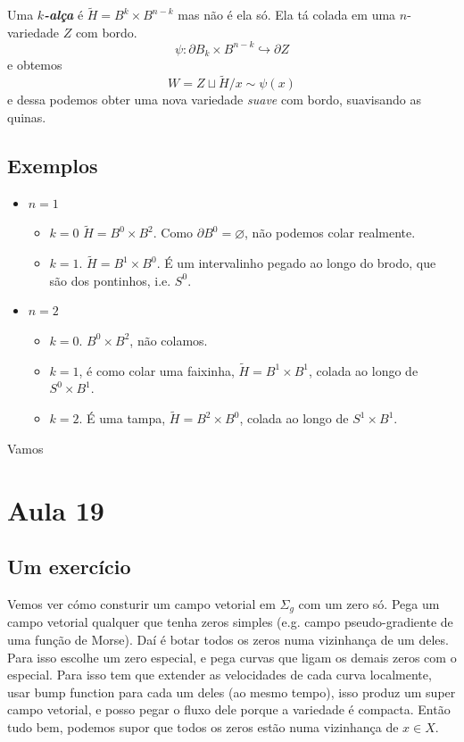 Uma \textit{\textbf{\(k\)-alça}} é \(\tilde{H}=B^k \times B^{n-k}\) mas não é ela só. Ela tá colada em uma \(n\)-variedade \(Z\) com bordo.
\[\psi: \partial B_k \times B^{n-k} \hookrightarrow  \partial Z\]
e obtemos
 \[W=Z \sqcup \tilde{H}\Big/ x \sim \psi(x)\]
e dessa podemos obter uma nova variedade \textit{suave}  com bordo, suavisando as quinas.

\subsection{Exemplos}
\begin{itemize}
\item \(n=1\) 
	\begin{itemize}
	\item \(k=0\)  \(\tilde{H}= B^0 \times B^2\). Como \(\partial B^0=\varnothing\), não podemos colar realmente.
	\item \(k=1\). \(\tilde{H}=B^1 \times B^0\). É um intervalinho pegado ao longo do brodo, que são dos pontinhos, i.e. \(S^0\).
	\end{itemize}
\item \(n=2\)
	\begin{itemize}
	\item \(k=0\).  \(B^0 \times B^2\), não colamos.
	\item \(k=1\),  é como colar uma faixinha, \(\tilde{H}=B^1 \times B^1\), colada ao longo de \(S^0 \times B^1\).
	\item \(k=2\).  É uma tampa, \(\tilde{H}=B^2 \times B^0\), colada ao longo de  \(S^1 \times B^1\).
	\end{itemize}
\end{itemize}

Vamos 

\section{Aula 19}

\subsection{Um exercício}

Vemos ver cómo consturir um campo vetorial em \(\Sigma_g\) com um zero só. Pega um campo vetorial qualquer que tenha zeros simples (e.g. campo pseudo-gradiente de uma função de Morse). Daí é botar todos os zeros numa vizinhança de um deles. Para isso escolhe um zero especial, e pega curvas que ligam os demais zeros com o especial. Para isso tem que extender as velocidades de cada curva localmente, usar bump function para cada um deles (ao mesmo tempo), isso produz um super campo vetorial, e posso pegar o fluxo dele porque a variedade é compacta. Então tudo bem, podemos supor que todos os zeros estão numa vizinhança de  \(x \in X\).

